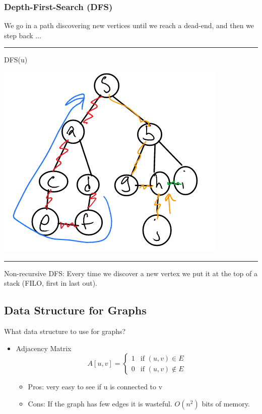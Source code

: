 \documentclass[11pt]{article}
\begin{document}
\subsubsection{Depth-First-Search (DFS)}
\label{sec:orge923f72}
We go in a path discovering new vertices until we reach a dead-end, and then we step back \(\ldots\)

\noindent\rule{\textwidth}{0.5pt}
\begin{algorithmic}
  \State DFS(u)
        \EndIf
  \EndFor        
\end{algorithmic}
\begin{center}
\includegraphics[width=.9\linewidth]{./Images/i18.png}
\end{center}

\noindent\rule{\textwidth}{0.5pt}
Non-recursive DFS: Every time we discover a new vertex we put it at the top of a stack (FILO, first in last out).
\subsection{Data Structure for Graphs}
\label{sec:org52f1419}
What data structure to use for graphs?
\begin{itemize}
\item Adjacency Matrix
\begin{equation*}
  A[u,v] =
  \begin{cases}
    1 & \text{if }(u,v)\in E
    \\ 0 & \text{if }(u,v)\notin E
  \end{cases}
\end{equation*}
\begin{itemize}
\item Pros: very easy to see if u is connected to v
\item Cons: If the graph has few edges it is wasteful. \(O(n^2)\) bits of memory.
\end{itemize}
\end{itemize}
\end{document}
